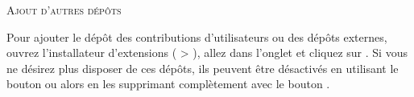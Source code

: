 
\begin{Tip} \caption{\textsc{Ajout d'autres dépôts}}
Pour ajouter le dépôt des contributions d'utilisateurs ou des dépôts externes, ouvrez l'installateur d'extensions ( > ), allez dans l'onglet  et cliquez sur . Si vous ne désirez plus disposer de ces dépôts, ils peuvent être désactivés en utilisant le bouton  ou alors en les supprimant complètement avec le bouton .
\end{Tip}

